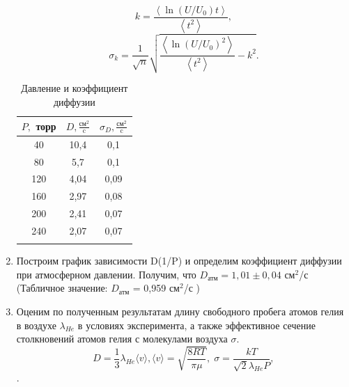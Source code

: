 \documentclass[a4paper, 12pt]{article}%
\begin{document}
\begin{enumerate}
$$k = \frac{\left<\ln(U/U_0) t \right>}{\left<t^2 \right>},$$
$$\sigma_k = \frac{1}{\sqrt{n}}\sqrt{\frac{\left<\ln (U/U_0)^2\right>}{\left<t^2\right>}-k^2}.$$ 


	\begin{longtable}{|c|c|c|}
	\hline
	$P,$ торр & $D, \frac{\text{см}^2}{\text{c}}$ & $\sigma_D, \frac{\text{см}^2}{\text{c}}$\\
	 \hline
	40 & 10,4 & 0,1 \\ 
	\hline
	80 & 5,7 & 0,1 \\ 
	\hline
	120 &4,04& 0,09 \\ 
	\hline
	160& 2,97 & 0,08 \\ 
	\hline
	200& 2,41 & 0,07 \\ 
	\hline
	240& 2,07 & 0,07 \\ 
	\hline
	\caption{Давление и коэффициент диффузии}
\end{longtable}


\item Построим график зависимости D(1/P) и определим коэффициент диффузии при атмосферном давлении. Получим, что $D_{\text{атм}} = 1,01 \pm 0,04$ см$^2$/с (Табличное значение: $D_{\text{атм}}$ = 0,959 см$^2$/с )

	\begin{figure}[h]
	\caption{}
\end{figure}

\newpage



\item Оценим по полученным результатам длину свободного пробега  атомов
гелия в воздухе $\lambda_{He}$ в условиях эксперимента, а также эффективное сечение столкновений атомов гелия с молекулами воздуха $\sigma$.   $$D = \frac{1}{3} \lambda_{He} \langle v \rangle,      
\langle v \rangle = \sqrt{\frac{8RT}{\pi \mu}}, \; \sigma = \frac{kT}{\sqrt{2}\lambda_{He} P},$$.


\end{enumerate}
\end{document}
